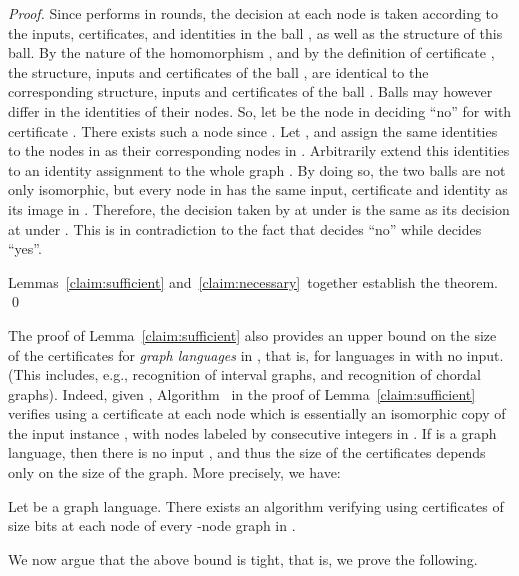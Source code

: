\documentclass{llncs}
\newenvironment{proofofclaim}{\noindent {\em Proof.}}{\hfill  \medbreak}
\begin{document}
\begin{proof}
\begin{proofofclaim}
Since  performs in  rounds, the decision at each node  is taken according to the inputs, certificates, and identities in the ball , as well as the structure of this ball. By the nature of the homomorphism , and by the definition of certificate , the structure, inputs and certificates of the ball , are identical to  the corresponding structure, inputs and certificates of the ball . Balls may however differ in the identities of their nodes. So,  let  be the node in  deciding ``no'' for  with certificate . There exists such a node since . Let , and assign  the same identities to the nodes in   as their corresponding nodes in . Arbitrarily extend this identities to an identity assignment  to  the whole graph . By doing so, the two balls are not only isomorphic, but every node in  has the same input, certificate and identity as its image in . Therefore, the decision taken by  at  under  is the same as its decision at  under . This is in contradiction to the fact that   decides ``no'' while  decides ``yes''.  
\end{proofofclaim}

Lemmas~\ref{claim:sufficient} and~\ref{claim:necessary}~together establish the theorem. 
\qed
\end{proof}

The proof of Lemma~\ref{claim:sufficient} also provides an upper bound on the size of the certificates for \emph{graph languages} in , that is, for languages in  with no input. (This includes, e.g., recognition of interval graphs, and recognition of chordal graphs). Indeed, given , Algorithm~ in the proof of Lemma~\ref{claim:sufficient} verifies  using a certificate at each node which is essentially an isomorphic copy of the input instance , with nodes labeled by consecutive integers in . If  is a graph language, then there is no input , and thus the size of the certificates depends only on the size of the graph. More precisely, we have:  

\begin{corollary}\label{cor:mlogn}
Let  be a graph language. There exists an algorithm verifying  using certificates of size   bits at each node of every -node graph in . 
\end{corollary}

We now argue that the above bound is tight, that is, we prove the following.
\end{document}
